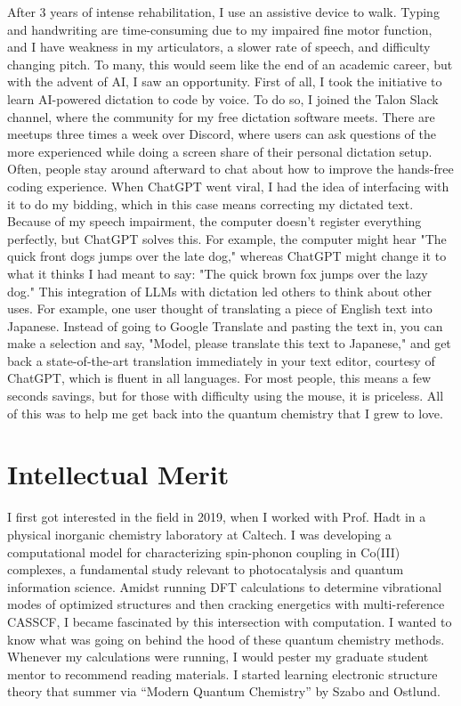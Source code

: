 \documentclass[11pt]{article} %
\begin{document}
After 3 years of intense rehabilitation, I use an assistive device to walk. Typing and handwriting are time-consuming due to my impaired fine motor function, and I have weakness in my articulators, a slower rate of speech, and difficulty changing pitch. To many, this would seem like the end of an academic career, but with the advent of AI, I saw an opportunity. First of all, I took the initiative to learn AI-powered dictation to code by voice. To do so, I joined the Talon Slack channel, where the community for my free dictation software meets. There are meetups three times a week over Discord, where users can ask questions of the more experienced while doing a screen share of their personal dictation setup. Often, people stay around afterward to chat about how to improve the hands-free coding experience. When ChatGPT went viral, I had the idea of interfacing with it to do my bidding, which in this case means correcting my dictated text. Because of my speech impairment, the computer doesn't register everything perfectly, but ChatGPT solves this. For example, the computer might hear "The quick front dogs jumps over the late dog," whereas ChatGPT might change it to what it thinks I had meant to say: "The quick brown fox jumps over the lazy dog." This integration of LLMs with dictation led others to think about other uses. For example, one user thought of translating a piece of English text into Japanese. Instead of going to Google Translate and pasting the text in, you can make a selection and say, "Model, please translate this text to Japanese," and get back a state-of-the-art translation immediately in your text editor, courtesy of ChatGPT, which is fluent in all languages. For most people, this means a few seconds savings, but for those with difficulty using the mouse, it is priceless. All of this was to help me get back into the quantum chemistry that I grew to love.
\section{Intellectual Merit}
I first got interested in the field in 2019, when I worked with Prof. Hadt in a physical inorganic chemistry laboratory at Caltech. I was developing a computational model for characterizing spin-phonon coupling in Co(III) complexes, a fundamental study relevant to photocatalysis and quantum information science. Amidst running DFT calculations to determine vibrational modes of optimized structures and then cracking energetics with multi-reference CASSCF, I became fascinated by this intersection with computation. I wanted to know what was going on behind the hood of these quantum chemistry methods. Whenever my calculations were running, I would pester my graduate student mentor to recommend reading materials. I started learning electronic structure theory that summer via “Modern Quantum Chemistry” by Szabo and Ostlund.
\end{document}
